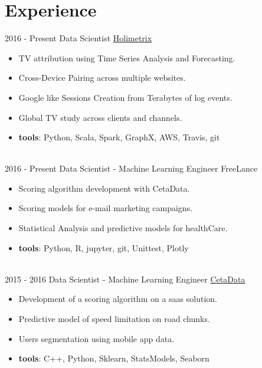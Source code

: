 \documentclass[letterpaper]{twentysecondcv} %
\begin{document}
\makeprofile %



\section{Experience}{\faAlignJustify}

\begin{twenty} %
\twentyitem
    	{2016 -}
		{Present}
        {Data Scientist}
        {\href{http://www.holimetrix.ccom/}{Holimetrix}}
        {}
        {
				\begin{itemize}
				\item TV attribution using Time Series Analysis and Forecasting. 
				\item Cross-Device Pairing across multiple websites.
				\item Google like Sessions Creation from Terabytes of log events.
				\item Global TV study across clients and channels.
				\item \textbf{tools}: Python, Scala, Spark, GraphX, AWS, Travis, git
				\end{itemize}} \\
				
	\twentyitem
    	{2016 -}
		{Present}
        {Data Scientist - Machine Learning Engineer}
        {FreeLance}
        {}
        {\begin{itemize}
        \item Scoring algorithm development with CetaData.
        \item Scoring models for e-mail marketing campaigns. 
        \item Statistical Analysis and predictive models for healthCare. 
				\item \textbf{tools}: Python, R, jupyter, git, Unittest, Plotly
    \end{itemize}}\\
		
    \twentyitem
   		{2015 - 2016}
		{}
        {Data Scientist - Machine Learning Engineer}
        {\href{http://www.cetadata.com/}{CetaData}}
        {}
        {\begin{itemize}
				\item Development of a scoring algorithm on a saas solution.
        \item Predictive model of speed limitation on road chunks.
				\item Users segmentation using mobile app data.
				\item \textbf{tools}: C++, Python, Sklearn, StatsModels, Seaborn
    \end{itemize}} \\
		

\end{twenty}
\end{document}
